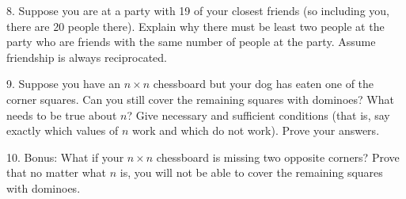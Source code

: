 \documentclass[10pt,]{book}
\theoremstyle{plain}
\theoremstyle{definition}
\theoremstyle{definition}
\theoremstyle{definition}
\numberwithin{equation}{chapter}
\begin{document}
\begin{exerciselist}
\begin{enumerate}[label=(\alph*)]
\end{enumerate}
\par\smallskip
\item[8.]\hypertarget{exercise-262}{}
            Suppose you are at a party with 19 of your closest friends (so including you, there are 20 people there). Explain why there must be least two people at the party who are friends with the same number of people at the party. Assume friendship is always reciprocated.
\par\smallskip
\item[9.]\hypertarget{exercise-263}{}
            Suppose you have an \(n\times n\) chessboard but your dog has eaten one of the corner squares. Can you still cover the remaining squares with dominoes? What needs to be true about \(n\)? Give necessary and sufficient conditions (that is, say exactly which values of \(n\) work and which do not work). Prove your answers.
\leavevmode%
\begin{figure}
\centering
{
}
\end{figure}
\par\smallskip
\item[10.]\hypertarget{exercise-264}{}
            Bonus: What if your \(n\times n\) chessboard is missing two opposite corners? Prove that no matter what \(n\) is, you will not be able to cover the remaining squares with dominoes.
\leavevmode%
\begin{figure}
\centering
{
}
\end{figure}
\par\smallskip
\end{exerciselist}
\typeout{************************************************}
\typeout{************************************************}
\end{document}
